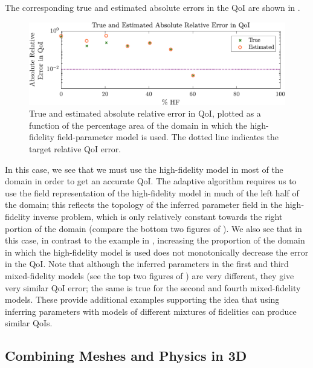 \documentclass[review,sort&compress]{elsarticle}
\begin{document}
%
The corresponding true and estimated absolute errors in the QoI are shown in .
%
\begin{figure}[htbp]
\centering
\includegraphics[width=\textwidth]{svf/err_est_v2.pdf}
\caption{True and estimated absolute relative error in QoI, plotted as a function of the percentage area of the domain in which the high-fidelity field-parameter model is used. The dotted line indicates the target relative QoI error.}
\label{fig:svfErr}
\end{figure}
%
In this case, we see that we must use the high-fidelity model in most of the domain in order to get an accurate QoI. The adaptive algorithm requires us to use the field representation of the high-fidelity model in much of the left half of the domain; this reflects the topology of the inferred parameter field in the high-fidelity inverse problem, which is only relatively constant towards the right portion of the domain (compare the bottom two figures of ). We also see that in this case, in contrast to the example in , increasing the proportion of the domain in which the high-fidelity model is used does not monotonically decrease the error in the QoI. Note that although the inferred parameters in the first and third mixed-fidelity models (see the top two figures of ) are very different, they give very similar QoI error; the same is true for the second and fourth mixed-fidelity models. These provide additional examples supporting the idea that using inferring parameters with models of different mixtures of fidelities can produce similar QoIs.

\subsection{Combining Meshes and Physics in 3D} \label{sec:diffvcdr3D}
\end{document}
